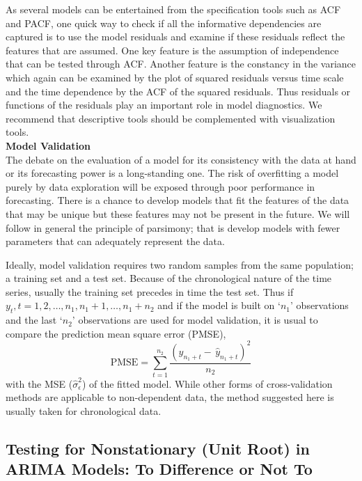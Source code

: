 As several models can be entertained from the specification tools such as ACF and PACF, one quick way to check if all the informative dependencies are captured is to use the model residuals and examine if these residuals reflect the features that are assumed. One key feature is the assumption of independence that can be tested through ACF. Another feature is the constancy in the variance which again can be examined by the plot of squared residuals versus time scale and the time dependence by the ACF of the squared residuals. Thus residuals or functions of the residuals play an important role in model diagnostics. We recommend that descriptive tools should be complemented with visualization tools. \\


\noindent \textbf{Model Validation} \\


The debate on the evaluation of a model for its consistency with the data at hand or its forecasting power is a long-standing one. The risk of overfitting a model purely by data exploration will be exposed through poor performance in forecasting. There is a chance to develop models that fit the features of the data that may be unique but these features may not be present in the future. We will follow in general the principle of parsimony; that is develop models with fewer parameters that can adequately represent the data. 


Ideally, model validation requires two random samples from the same population; a training set and a test set. Because of the chronological nature of the time series, usually the training set precedes in time the test set. Thus if $y_t, t= 1,2, \ldots,n_1, n_1+1, \ldots, n_1+n_2$ and if the model is built on `$n_1$' observations and the last `$n_2$' observations are used for model validation, it is usual to compare the prediction mean square error (PMSE),
	\begin{equation} \label{eqn:pmse}
	\text{PMSE} = \sum_{t=1}^{n_2} \frac{(y_{n_1+t} - \,\hat{y}_{n_1+t})^2}{n_2}
	\end{equation}
with the MSE ($\hat{\sigma}_\epsilon^2$) of the fitted model. While other forms of cross-validation methods are applicable to non-dependent data, the method suggested here is usually taken for chronological data.



\subsection{Testing for Nonstationary (Unit Root) in ARIMA Models: To Difference or Not To \label{sec:diffornot}} 



